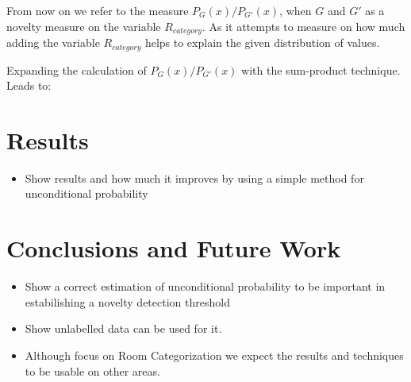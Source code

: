 \documentclass[runningheads,a4paper]{llncs}
\begin{document}
From now on we refer to the measure $P_G(x)/P_{G'}(x)$, when $G$ and $G'$ as a novelty measure on the variable $R_{category}$.
As it attempts to measure on how much adding the variable $R_{category}$ helps to explain the given distribution of values.

Expanding the calculation of $P_G(x)/P_{G'}(x)$ with the sum-product technique. Leads to:

\section{Results}
\begin{itemize}
\item Show results and how much it improves by using a simple method for unconditional probability
\end{itemize}

\section{Conclusions and Future Work}
\begin{itemize}
\item Show a correct estimation of unconditional probability to be important in estabilishing a novelty detection threshold
\item Show unlabelled data can be used for it.
\item Although focus on Room Categorization we expect the results and techniques to be usable on other areas.
\end{itemize}



\end{document}
